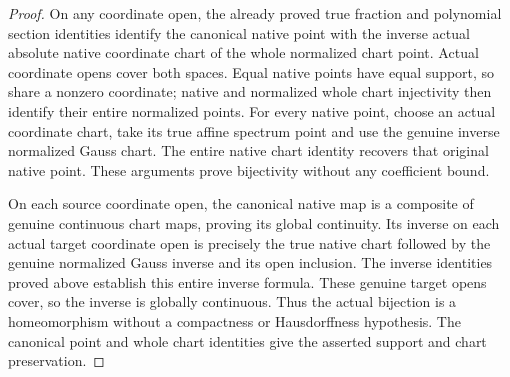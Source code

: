 \begin{proof}
On any coordinate open, the already proved true fraction and polynomial
section identities identify the canonical native point with the inverse
actual absolute native coordinate chart of the whole normalized chart
point. Actual coordinate opens cover both spaces. Equal native points
have equal support, so share a nonzero coordinate; native and normalized
whole chart injectivity then identify their entire normalized points.
For every native point, choose an actual coordinate chart, take its
true affine spectrum point and use the genuine inverse normalized Gauss
chart. The entire native chart identity recovers that original native
point. These arguments prove bijectivity without any coefficient bound.

On each source coordinate open, the canonical native map is a composite
of genuine continuous chart maps, proving its global continuity. Its
inverse on each actual target coordinate open is precisely the true
native chart followed by the genuine normalized Gauss inverse and its
open inclusion. The inverse identities proved above establish this
entire inverse formula. These genuine target opens cover, so the
inverse is globally continuous. Thus the actual bijection is a
homeomorphism without a compactness or Hausdorffness hypothesis.
The canonical point and whole chart identities give the asserted
support and chart preservation.
\end{proof}

